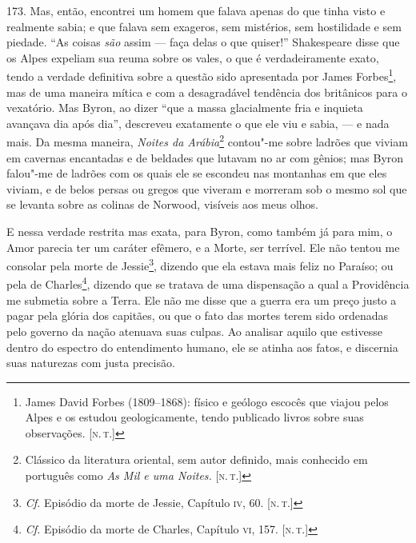 173. Mas, então, encontrei um homem que falava apenas do que tinha visto
e realmente sabia; e que falava sem exageros, sem mistérios, sem
hostilidade e sem piedade. ``As coisas \emph{são} assim --- faça delas o
que quiser!'' Shakespeare disse que os Alpes expeliam sua reuma sobre os
vales, o que é verdadeiramente exato, tendo a verdade definitiva sobre a
questão sido apresentada por James Forbes\footnote{James David Forbes
  (1809--1868): físico e geólogo escocês que viajou pelos Alpes e os
  estudou geologicamente, tendo publicado livros sobre suas observações.
  {[}\textsc{n.\,t.}{]}}, mas de uma maneira mítica e com a desagradável
tendência dos britânicos para o vexatório. Mas Byron, ao dizer ``que a
massa glacialmente fria e inquieta avançava dia após dia'', descreveu
exatamente o que ele viu e sabia, --- e nada mais. Da mesma maneira,
\emph{Noites da Arábia}\footnote{Clássico da literatura oriental, sem
  autor definido, mais conhecido em português como \emph{As Mil e uma
  Noites.} {[}\textsc{n.\,t.}{]}} contou"-me sobre ladrões que viviam em
cavernas encantadas e de beldades que lutavam no ar com gênios; mas
Byron falou"-me de ladrões com os quais ele se escondeu nas montanhas em
que eles viviam, e de belos persas ou gregos que viveram e morreram sob
o mesmo sol que se levanta sobre as colinas de Norwood, visíveis aos
meus olhos.

E nessa verdade restrita mas exata, para Byron, como também já para mim,
o Amor parecia ter um caráter efêmero, e a Morte, ser terrível. Ele não
tentou me consolar pela morte de Jessie\footnote{\emph{Cf.} Episódio da
  morte de Jessie, Capítulo \textsc{iv}, 60. {[}\textsc{n.\,t.}{]}}, dizendo que ela
estava mais feliz no Paraíso; ou pela de Charles\footnote{\emph{Cf.}
  Episódio da morte de Charles, Capítulo \textsc{vi}, 157. {[}\textsc{n.\,t.}{]}},
dizendo que se tratava de uma dispensação a qual a Providência me
submetia sobre a Terra. Ele não me disse que a guerra era um preço justo
a pagar pela glória dos capitães, ou que o fato das mortes terem sido
ordenadas pelo governo da nação atenuava suas culpas. Ao analisar aquilo
que estivesse dentro do espectro do entendimento humano, ele se atinha
aos fatos, e discernia suas naturezas com justa precisão.

